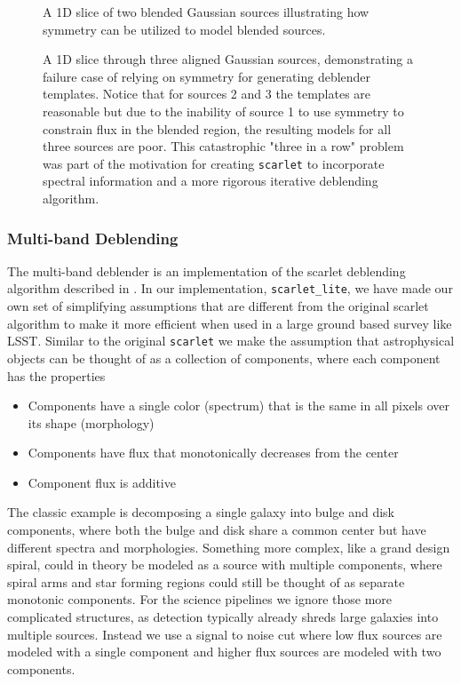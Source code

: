 \begin{figure}
    \centering
    \caption{A 1D slice of two blended Gaussian sources illustrating how symmetry can be utilized to model blended sources.}
    \label{fig:simple_blend}
\end{figure}

\begin{figure}
    \centering
    \caption{A 1D slice through three aligned Gaussian sources, demonstrating a failure case of relying on symmetry for generating deblender templates. Notice that for sources 2 and 3 the templates are reasonable but due to the inability of source 1 to use symmetry to constrain flux in the blended region, the resulting models for all three sources are poor. This catastrophic "three in a row" problem was part of the motivation for creating \texttt{scarlet} to incorporate spectral information and a more rigorous iterative deblending algorithm.}
    \label{fig:complex_blend}
\end{figure}

\subsubsection{Multi-band Deblending}
\label{sec:multiband_deblending}

The multi-band deblender is an implementation of the scarlet deblending algorithm described in \citet{2018A&C....24..129M}.
In our implementation, \texttt{scarlet\_lite}, we have made our own set of simplifying assumptions that are different from the original scarlet algorithm to make it more efficient when used in a large ground based survey like LSST.
Similar to the original \texttt{scarlet} we make the assumption that astrophysical objects can be thought of as a collection of components, where each component has the properties
\begin{itemize}
    \item Components have a single color (spectrum) that is the same in all pixels over its shape (morphology)
    \item Components have flux that monotonically decreases from the center
    \item Component flux is additive
\end{itemize}

The classic example is decomposing a single galaxy into bulge and disk components, where both the bulge and disk share a common center but have different spectra and morphologies.
Something more complex, like a grand design spiral, could in theory be modeled as a source with multiple components, where spiral arms and star forming regions could still be thought of as separate monotonic components.
For the science pipelines we ignore those more complicated structures, as detection typically already shreds large galaxies into multiple sources.
Instead we use a signal to noise cut where low flux sources are modeled with a single component and higher flux sources are modeled with two components.

